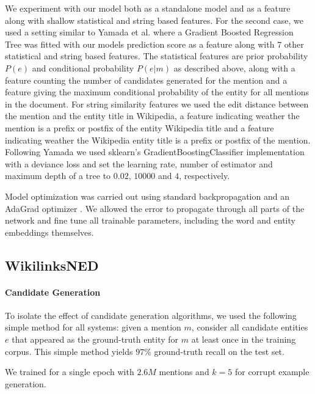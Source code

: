 \documentclass[11pt]{article}
\begin{document}
We experiment with our model both as a standalone model and as a feature along with shallow statistical and string based features. For the second case, we used a setting similar to Yamada et al.  where a Gradient Boosted Regression Tree was fitted with our models prediction score as a feature along with $7$ other statistical and string based features. The statistical features are prior probability $P(e)$ and conditional probability $P(e|m)$ as described above, along with a feature counting the number of candidates generated for the mention and a feature giving the maximum conditional probability of the entity for all mentions in the document. For string similarity features we used the edit distance between the mention and the entity title in Wikipedia, a feature indicating weather the mention is a prefix or postfix of the entity Wikipedia title and a feature indicating weather the Wikipedia entity title is a prefix or postfix of the mention. Following Yamada we used sklearn's GradientBoostingClassifier implementation \cite{pedregosa2011scikit} with a deviance loss and set the learning rate, number of estimator and maximum depth of a tree to $0.02$, $10000$ and $4$, respectively. 



Model optimization was carried out using standard backpropagation and an AdaGrad optimizer \cite{duchi2011adaptive}. We allowed the error to propagate through all parts of the network and fine tune all trainable parameters, including the word and entity embeddings themselves.


\subsection{WikilinksNED}

\paragraph{Candidate Generation}
To isolate the effect of candidate generation algorithms, we used the following simple method for all systems: given a mention $m$, consider all candidate entities $e$ that appeared as the ground-truth entity for $m$ at least once in the training corpus. This simple method yields $97\%$ ground-truth recall on the test set.

We trained for a single  epoch with $2.6M$ mentions and $k=5$ for corrupt example generation.
\end{document}
